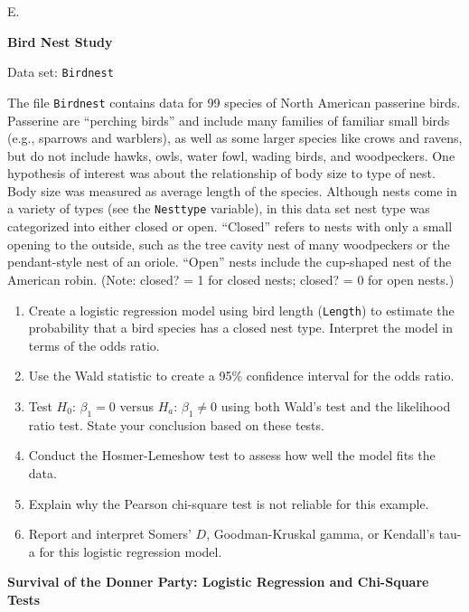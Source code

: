 \documentclass[
]{report}
\newcounter{excount}
\renewcommand{\theexcount}{E\arabic{excount}}
\begin{document}
\begin{list}{\theexcount.}{ \setlength{\itemsep}{1.2em}}

  \item \textbf{Bird Nest Study}

Data set: \texttt{Birdnest}

The file \texttt{Birdnest} contains data for 99 species of North American passerine birds. Passerine are “perching birds” and include many families of familiar small birds (e.g., sparrows and warblers), as well as some larger species like crows and ravens, but do not include hawks, owls, water fowl, wading birds, and woodpeckers. One hypothesis of interest was about the relationship of body size to type of nest. Body size was measured as average length of the species. Although nests come in a variety of types (see the \texttt{Nesttype} variable), in this data set nest type was categorized into either closed or open. “Closed” refers to nests with only a small opening to the outside, such as the tree cavity nest of many woodpeckers or the pendant-style nest of an oriole. “Open” nests include the cup-shaped nest of the American robin. (Note: closed? = 1 for closed nests; closed? = 0 for open nests.)

  \begin{enumerate}
    \item Create a logistic regression model using bird length (\texttt{Length}) to estimate the probability that a bird species has a closed nest type. Interpret the model in terms of the odds ratio.
    \item Use the Wald statistic to create a 95\% confidence interval for the odds ratio.
    \item Test $H_0$: $\beta_1 = 0$ versus $H_a$: $\beta_1 \ne 0$ using both Wald’s test and the likelihood ratio test. State your conclusion based on these tests.
    \item Conduct the Hosmer-Lemeshow test to assess how well the model fits the data.
    \item Explain why the Pearson chi-square test is not reliable for this example.
    \item Report and interpret Somers’ $D$, Goodman-Kruskal gamma, or Kendall’s tau-a for this logistic regression model.
  \end{enumerate}

  \item \textbf{Survival of the Donner Party: Logistic Regression and Chi-Square Tests}


\end{list}
\end{document}
